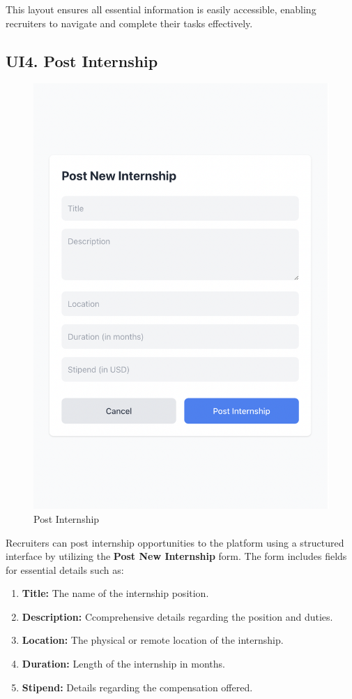 This layout ensures all essential information is easily accessible, enabling recruiters to navigate and complete their tasks effectively.

\subsection{UI4. Post Internship}
\label{subsec:post_internship_ui}%

\begin{figure}[H]
    \begin{center}
        \includegraphics[width=0.62\linewidth]{JhaBhatiaSharma/imagesDD/PostInternship.png}
        \caption{Post Internship}
        \label{fig:postInternship}
    \end{center}
\end{figure}

Recruiters can post internship opportunities to the platform using a structured interface by utilizing the \textbf{Post New Internship} form. The form includes fields for essential details such as:
\begin{enumerate}
    \item \textbf{Title:} The name of the internship position.
    \item \textbf{Description:} Ccomprehensive details regarding the position and duties.
    \item \textbf{Location:} The physical or remote location of the internship.
    \item \textbf{Duration:} Length of the internship in months.
    \item \textbf{Stipend:} Details regarding the compensation offered.
\end{enumerate}

